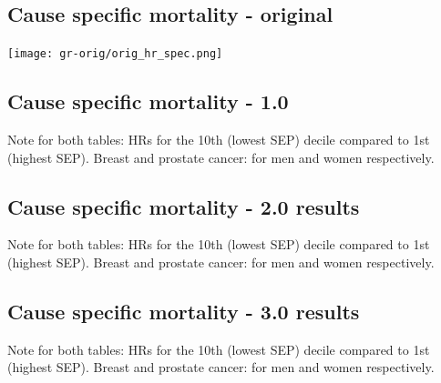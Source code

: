 \documentclass[a4paper, notitlepage, fleqn]{article} %
\begin{document}
\newpage
\subsection{Cause specific mortality - original}

\begin{center}
\texttt{[image: gr-orig/orig\_hr\_spec.png]} 
\end{center}

\newpage
\subsection{Cause specific mortality - 1.0}
\begin{stlog}\end{stlog}
Note for both tables: HRs for the 10th (lowest SEP) decile compared to 1st (highest SEP). 
Breast and prostate cancer: for men and women respectively. 

\newpage
\subsection{Cause specific mortality - 2.0 results}
\begin{stlog}\end{stlog}
Note for both tables: HRs for the 10th (lowest SEP) decile compared to 1st (highest SEP). 
Breast and prostate cancer: for men and women respectively. 

\newpage
\subsection{Cause specific mortality - 3.0 results}
\begin{stlog}\end{stlog}
Note for both tables: HRs for the 10th (lowest SEP) decile compared to 1st (highest SEP). 
Breast and prostate cancer: for men and women respectively. 
\end{document}
